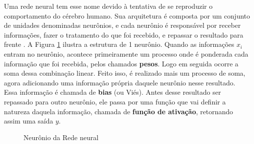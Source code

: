 Uma rede neural tem esse nome devido à tentativa de se reproduzir o comportamento do cérebro humano.
 Sua arquitetura é composta por um conjunto de unidades denominadas neurônios, e cada neurônio é 
 responsável por receber informações, fazer o tratamento do que foi recebido, e repassar o resultado 
 para frente \cite{ai_3rd_edition}. A Figura \ref{fig:neuronio} ilustra a estrutura de 1 neurônio.
  Quando as informações $x_i$ entram no neurônio, acontece primeiramente um processo 
  onde é ponderada cada informação que foi recebida, pelos chamados \textbf{pesos}. Logo
   em seguida ocorre a soma dessa combinação linear. Feito isso, é realizado mais um processo 
   de soma, agora adicionando uma informação própria daquele neurônio nesse resultado. 
   Essa informação é chamada de \textbf{bias} (ou Viés). Antes desse resultado ser repassado 
   para outro neurônio, ele passa por uma função que vai definir a natureza daquela informação, 
   chamada de \textbf{função de ativação}, retornando assim uma saída $y$.
 \begin{figure}[H]
    \centering
     \caption{Neurônio da Rede neural}
   
    \label{fig:neuronio}
\end{figure} 

